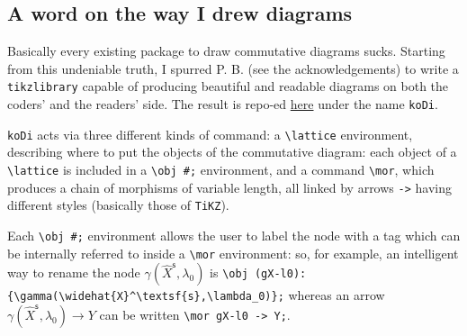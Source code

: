 \subsection*{A word on the way I drew diagrams}
Basically every existing package to draw commutative diagrams sucks. Starting from this undeniable truth, I spurred P. B\@. (see the acknowledgements) to write a {\tt tikzlibrary} capable of producing beautiful and readable diagrams on both the coders' and the readers' side. The result is repo\hyp{}ed \href{https://github.com/paolobrasolin/koDi}{here} under the name {\tt koDi}.

{\tt koDi} acts via three different kinds of command: a \verb|\lattice| environment, describing where to put the objects of the commutative diagram: each object of a \verb|\lattice| is included in a \verb|\obj #;| environment, and a command \verb|\mor|, which produces a chain of morphisms of variable length, all linked by arrows \verb|->| having different styles (basically those of \verb|TiKZ|).

Each \verb|\obj #;| environment allows the user to label the node with a tag which can be internally referred to inside a \verb|\mor| environment: so, for example, an intelligent way to rename the node $\gamma(\widehat{X}^\textsf{s},\lambda_0)$ is \verb|\obj (gX-l0):{\gamma(\widehat{X}^\textsf{s},\lambda_0)};| whereas an arrow $\gamma(\widehat{X}^\textsf{s},\lambda_0) \to Y$ can be written \verb|\mor gX-l0 -> Y;|.

